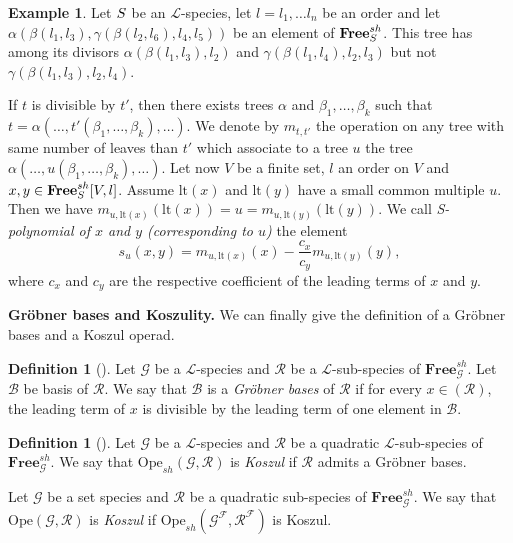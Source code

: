 \documentclass[11pt]{article}
\theoremstyle{definition}
\newtheorem{defi}[theo]{Definition}
\newtheorem{exam}[theo]{Example}
\numberwithin{equation}{section}
\newcommand{\spe}[1]{\normalfont{\textsc{#1}}}
\newcommand{\op}[1]{\mathbf{#1}}
\newcommand{\free}[1]{\op{Free}_{#1}}
\newcommand{\Ope}{\mathrm{Ope}}
\begin{document}
\begin{exam}
    Let $\spe{S}$ be an $\mathscr{L}$-species, let $l=l_1,\dots l_n$ be an order and let $\alpha(\beta(l_1,l_3),\gamma(\beta(l_2,l_6),l_4,l_5))$ be an element of $\free{\spe{S}}^{sh}$.
    This tree has among its divisors $\alpha(\beta(l_1,l_3),l_2)$ and $\gamma(\beta(l_1,l_4),l_2,l_3)$ but not $\gamma(\beta(l_1,l_3),l_2,l_4)$.
\end{exam}

If $t$ is divisible by $t'$, then there exists trees $\alpha$ and $\beta_1,\dots,\beta_k$ such that $t=\alpha(\dots, t'(\beta_1,\dots,\beta_k), \dots)$. We denote
by $m_{t,t'}$ the operation on any tree with same number of leaves than $t'$ which associate to a tree $u$ the tree $\alpha(\dots, u(\beta_1,\dots,\beta_k),\dots)$.
Let now $V$ be a finite set, $l$ an order on $V$ and $x,y\in\free{\spe{S}}^{sh}[V,l]$. Assume $\text{lt}(x)$ and $\text{lt}(y)$ have a small 
common multiple $u$. Then we have $m_{u,\text{lt}(x)}(\text{lt}(x)) = u = m_{u,\text{lt}(y)}(\text{lt}(y))$. We call {\em S-polynomial of $x$ and $y$ 
(corresponding to $u$)} the element
\begin{equation}
    s_u(x,y)= m_{u,\text{lt}(x)}(x) -\frac{c_x}{c_y}m_{u,\text{lt}(y)}(y),
\end{equation}
where $c_x$ and $c_y$ are the respective coefficient of the leading terms of $x$ and $y$.

\noindent\textbf{Gröbner bases and Koszulity.} We can finally give the definition of a Gröbner bases and a Koszul operad.

\begin{defi}[{\cite[Definition 13]{DK10}}]
    Let $\mathcal{G}$ be a $\mathscr{L}$-species and $\mathcal{R}$ be a $\mathscr{L}$-sub-species of $\free{\mathcal{G}}^{sh}$. Let $\mathcal{B}$ 
    be basis of $\mathcal{R}$.
    We say that $\mathcal{B}$ is a {\em Gröbner bases} of $\mathcal{R}$ if for every $x\in(\mathcal{R})$, the leading term of $x$ is divisible by 
    the leading term of one element in $\mathcal{B}$.
\end{defi}

\begin{defi}[{\cite[Corollary 3]{DK10}}]
    Let $\mathcal{G}$ be a $\mathscr{L}$-species and $\mathcal{R}$ be a quadratic $\mathscr{L}$-sub-species of $\free{\mathcal{G}}^{sh}$. We say that
    $\Ope_{sh}(\mathcal{G},\mathcal{R})$ is {\em Koszul} if $\mathcal{R}$ admits a Gröbner bases.

    Let $\mathcal{G}$ be a set species and $\mathcal{R}$ be a quadratic sub-species of $\free{\mathcal{G}}^{sh}$. We say that
    $\Ope(\mathcal{G},\mathcal{R})$ is {\em Koszul} if $\Ope_{sh}(\mathcal{G}^{\mathscr{F}},\mathcal{R}^{\mathscr{F}})$ is Koszul.
\end{defi}
\end{document}

